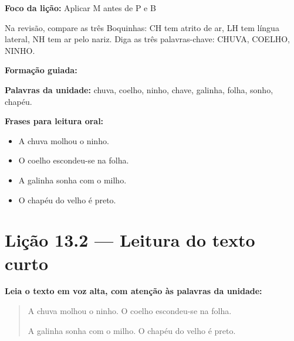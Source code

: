 \textbf{Foco da lição:} Aplicar M antes de P e B


\begin{boquinha}
Na revisão, compare as três Boquinhas: CH tem atrito de ar, LH tem língua lateral, NH tem ar pelo nariz. Diga as três palavras-chave: CHUVA, COELHO, NINHO.
\end{boquinha}

\noindent\textbf{Formação guiada:}

\begin{center}
\end{center}

\noindent\textbf{Palavras da unidade:} chuva, coelho, ninho, chave, galinha, folha, sonho, chapéu.

\noindent\textbf{Frases para leitura oral:}
\begin{itemize}[leftmargin=1.6em]
  \item A chuva molhou o ninho.
  \item O coelho escondeu-se na folha.
  \item A galinha sonha com o milho.
  \item O chapéu do velho é preto.
\end{itemize}

\section{Lição 13.2 --- Leitura do texto curto}

\noindent\textbf{Leia o texto em voz alta, com atenção às palavras da unidade:}


\begin{quote}
A chuva molhou o ninho. O coelho escondeu-se na folha.

A galinha sonha com o milho. O chapéu do velho é preto.
\end{quote}

